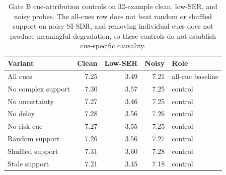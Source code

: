 \begin{table}[!t]
\caption{Gate B cue-attribution controls on 32-example clean, low-SER, and noisy probes. The all-cues row does not beat random or shuffled support on noisy SI-SDR, and removing individual cues does not produce meaningful degradation, so these controls do not establish cue-specific causality.}
\label{tab:gate-b-cue-attribution}
\centering
\scriptsize
\begin{tabular}{lrrrl}
\hline
Variant & Clean & Low-SER & Noisy & Role \\
\hline
All cues & 7.25 & 3.49 & 7.21 & all-cue baseline \\
No complex support & 7.30 & 3.57 & 7.25 & control \\
No uncertainty & 7.27 & 3.46 & 7.25 & control \\
No delay & 7.28 & 3.56 & 7.26 & control \\
No risk cue & 7.27 & 3.55 & 7.25 & control \\
Random support & 7.26 & 3.56 & 7.27 & control \\
Shuffled support & 7.31 & 3.60 & 7.28 & control \\
Stale support & 7.21 & 3.45 & 7.18 & control \\
\hline
\end{tabular}
\end{table}
